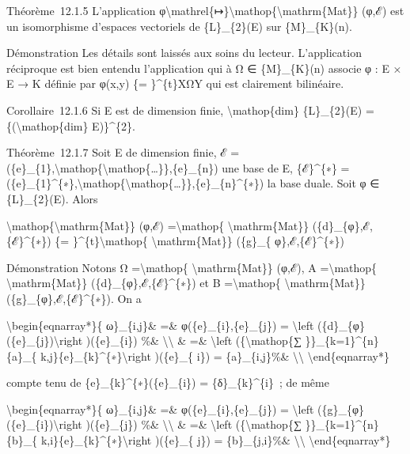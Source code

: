 \documentclass[]{article}
\begin{document}
Théorème~12.1.5 L'application
φ\textbackslash{}mathrel\{↦\}\textbackslash{}mathop\{\textbackslash{}mathrm\{Mat\}\}
(φ,ℰ) est un isomorphisme d'espaces vectoriels de \{L\}\_\{2\}(E) sur
\{M\}\_\{K\}(n).

Démonstration Les détails sont laissés aux soins du lecteur.
L'application réciproque est bien entendu l'application qui à Ω ∈
\{M\}\_\{K\}(n) associe φ : E × E → K définie par φ(x,y) \{=
\}\^{}\{t\}XΩY qui est clairement bilinéaire.

Corollaire~12.1.6 Si E est de dimension finie,
\textbackslash{}mathop\{dim\} \{L\}\_\{2\}(E) =
\{(\textbackslash{}mathop\{dim\} E)\}\^{}\{2\}.

Théorème~12.1.7 Soit E de dimension finie, ℰ =
(\{e\}\_\{1\},\textbackslash{}mathop\{\textbackslash{}mathop\{\ldots{}\}\},\{e\}\_\{n\})
une base de E, \{ℰ\}\^{}\{∗\} =
(\{e\}\_\{1\}\^{}\{∗\},\textbackslash{}mathop\{\textbackslash{}mathop\{\ldots{}\}\},\{e\}\_\{n\}\^{}\{∗\})
la base duale. Soit φ ∈ \{L\}\_\{2\}(E). Alors

\textbackslash{}mathop\{\textbackslash{}mathrm\{Mat\}\} (φ,ℰ)
=\textbackslash{}mathop\{ \textbackslash{}mathrm\{Mat\}\}
(\{d\}\_\{φ\},ℰ,\{ℰ\}\^{}\{∗\}) \{= \}\^{}\{t\}\textbackslash{}mathop\{
\textbackslash{}mathrm\{Mat\}\} (\{g\}\_\{ φ\},ℰ,\{ℰ\}\^{}\{∗\})

Démonstration Notons Ω =\textbackslash{}mathop\{
\textbackslash{}mathrm\{Mat\}\} (φ,ℰ), A =\textbackslash{}mathop\{
\textbackslash{}mathrm\{Mat\}\} (\{d\}\_\{φ\},ℰ,\{ℰ\}\^{}\{∗\}) et B
=\textbackslash{}mathop\{ \textbackslash{}mathrm\{Mat\}\}
(\{g\}\_\{φ\},ℰ,\{ℰ\}\^{}\{∗\}). On a

\textbackslash{}begin\{eqnarray*\}\{ ω\}\_\{i,j\}\& =\&
φ(\{e\}\_\{i\},\{e\}\_\{j\}) = \textbackslash{}left
(\{d\}\_\{φ\}(\{e\}\_\{j\})\textbackslash{}right )(\{e\}\_\{i\}) \%\&
\textbackslash{}\textbackslash{} \& =\& \textbackslash{}left
(\{\textbackslash{}mathop\{∑ \}\}\_\{k=1\}\^{}\{n\}\{a\}\_\{
k,j\}\{e\}\_\{k\}\^{}\{∗\}\textbackslash{}right )(\{e\}\_\{ i\}) =
\{a\}\_\{i,j\}\%\& \textbackslash{}\textbackslash{}
\textbackslash{}end\{eqnarray*\}

compte tenu de \{e\}\_\{k\}\^{}\{∗\}(\{e\}\_\{i\}) =
\{δ\}\_\{k\}\^{}\{i\}~; de même

\textbackslash{}begin\{eqnarray*\}\{ ω\}\_\{i,j\}\& =\&
φ(\{e\}\_\{i\},\{e\}\_\{j\}) = \textbackslash{}left
(\{g\}\_\{φ\}(\{e\}\_\{i\})\textbackslash{}right )(\{e\}\_\{j\}) \%\&
\textbackslash{}\textbackslash{} \& =\& \textbackslash{}left
(\{\textbackslash{}mathop\{∑ \}\}\_\{k=1\}\^{}\{n\}\{b\}\_\{
k,i\}\{e\}\_\{k\}\^{}\{∗\}\textbackslash{}right )(\{e\}\_\{ j\}) =
\{b\}\_\{j,i\}\%\& \textbackslash{}\textbackslash{}
\textbackslash{}end\{eqnarray*\}
\end{document}
